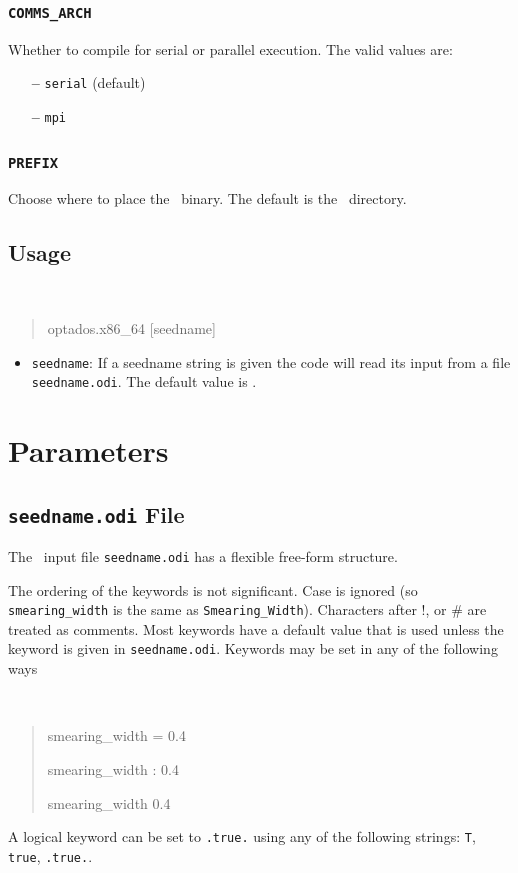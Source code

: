 \documentclass[a4paper,11pt,twoside]{book}
\begin{document}
\subsection[comms_arch]{\tt COMMS\_ARCH}

Whether to compile for serial or parallel execution. The valid values are:
\begin{itemize}
\item[{\bf --}]  \verb#serial# (default) 
\item[{\bf --}]  \verb#mpi# 
\end{itemize}

\subsection[bin_dir]{\tt PREFIX}
Choose where to place the \optados\ binary. The default is the \optados\ directory.


\section{Usage}
{\tt
\begin{quote}
optados.x86\_64  [seedname]
\end{quote} }
\begin{itemize}
\item{  {\tt seedname}: If a seedname string is given the code will read its input from a file {\tt seedname.odi}. The default value is \castep.}
\end{itemize}

\chapter{Parameters}\label{chap:parameters}

\section{{\tt seedname.odi} File}
The \optados\ input file {\tt seedname.odi} has a flexible free-form
structure. 

The ordering of the keywords is not significant. Case is ignored (so
\verb#smearing_width# is the same as \verb#Smearing_Width#). Characters after !, or \#
are treated as comments. Most keywords have a default value that is
used unless the keyword is given in {\tt seedname.odi}. Keywords may be set
in any of the following ways
{\tt
\begin{quote}
smearing\_width = 0.4

smearing\_width : 0.4

smearing\_width   0.4
\end{quote} }
A logical keyword can be set to {\tt .true.} using any of the following
strings: {\tt T}, {\tt true}, {\tt .true.}.
\end{document}
